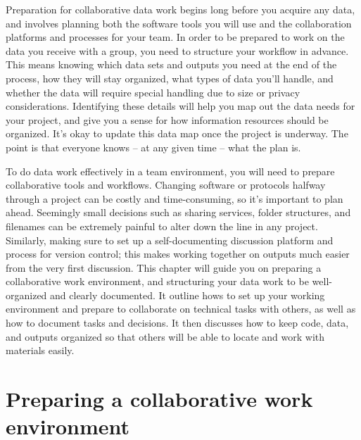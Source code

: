 
\begin{fullwidth}
Preparation for collaborative data work begins long before you acquire any data,
and involves planning both the software tools you will use
and the collaboration platforms and processes for your team.
In order to be prepared to work on the data you receive with a group,
you need to structure your workflow in advance.
This means knowing which data sets and outputs you need at the end of the process,
how they will stay organized, what types of data you'll handle,
and whether the data will require special handling due to size or privacy considerations.
Identifying these details will help you map out the data needs for your project,
and give you a sense for how information resources should be organized.
It's okay to update this data map once the project is underway.
The point is that everyone knows -- at any given time -- what the plan is.

To do data work effectively in a team environment,
you will need to prepare collaborative tools and workflows.
Changing software or protocols halfway through a project can be costly and time-consuming,
so it's important to plan ahead.
Seemingly small decisions such as sharing services, folder structures,
and filenames can be extremely painful to alter down the line in any project.
Similarly, making sure to set up a self-documenting discussion platform
and process for version control;
this makes working together on outputs much easier from the very first discussion.
This chapter will guide you on preparing a collaborative work environment,
and structuring your data work to be well-organized and clearly documented.
It outline hows to set up your working environment
and prepare to collaborate on technical tasks with others,
as well as how to document tasks and decisions.
It then discusses how to keep code, data, and outputs organized so that others
will be able to locate and work with materials easily.

\end{fullwidth}


\section{Preparing a collaborative work environment}

